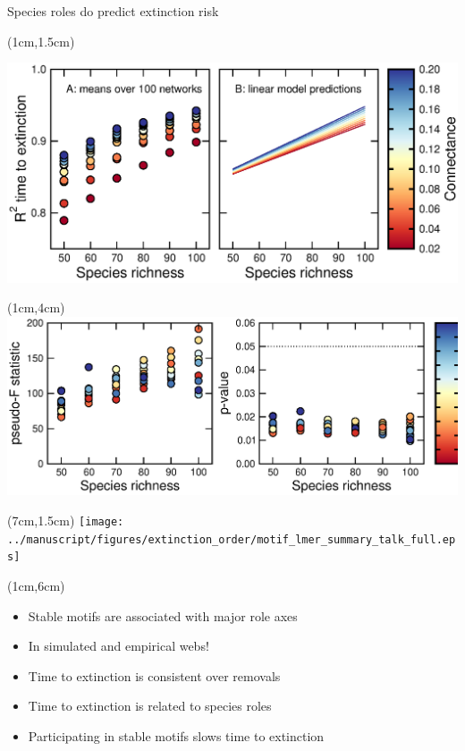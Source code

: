 \documentclass{beamer}
\begin{document}
  \begin{frame}{Species roles do predict extinction risk}

    \begin{textblock*}{5cm}(1cm,1.5cm)
      \begin{center}
      \vspace{-0.5cm}
      \includegraphics[width=.9\textwidth]{../manuscript/figures/extinction_order/extorder_correlations_talk_full.eps}

      \end{center}
    \end{textblock*}

    \begin{textblock*}{5cm}(1cm,4cm)
      \includegraphics[width=\textwidth]{../manuscript/figures/extinction_order/permanova_summary_talk_full.eps}
    \end{textblock*}

    \begin{textblock*}{5cm}(7cm,1.5cm)
      \texttt{[image: ../manuscript/figures/extinction\_order/motif\_lmer\_summary\_talk\_full.eps]}
    \end{textblock*}

    \begin{textblock*}{10cm}(1cm,6cm)

    \begin{itemize}
      \item Stable motifs are associated with major role axes
      \item In simulated and empirical webs!
      \item Time to extinction is consistent over removals
      \item Time to extinction is related to species roles
      \item Participating in stable motifs slows time to extinction
    \end{itemize}
    \end{textblock*}

    \end{frame}
\end{document}
